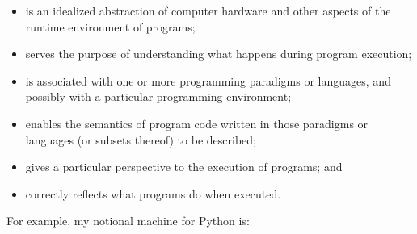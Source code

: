 \begin{itemize}
\item
  is an idealized abstraction of computer hardware and other aspects
  of the runtime environment of programs;
\item
  serves the purpose of understanding what happens during program
  execution;
\item
  is associated with one or more programming paradigms or languages,
  and possibly with a particular programming environment;
\item
  enables the semantics of program code written in those paradigms or
  languages (or subsets thereof) to be described;
\item
  gives a particular perspective to the execution of programs; and
\item
  correctly reflects what programs do when executed.
\end{itemize}

For example, my notional machine for Python is:

